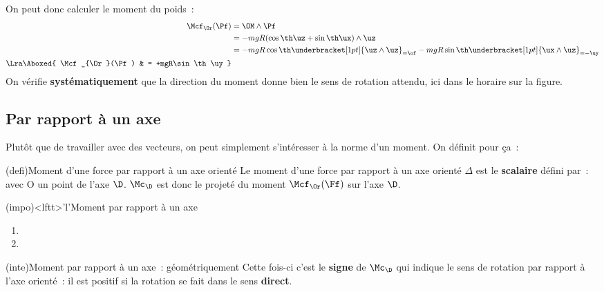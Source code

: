\documentclass[../../main/main.tex]{subfiles}
\begin{document}
\begin{tcb*}
{		On peut donc calculer le moment du poids~:
		\begin{align*}
			\Mcf_{\Or}(\Pf) & = \OM\wedge\Pf                                       \\
			                & = -mgR(\cos\th\uz + \sin\th\ux)\wedge\uz             \\
			                & = -mgR\cos\th\underbracket[1pt]{\uz\wedge\uz}_{=\of}
			-mgR\sin\th\underbracket[1pt]{\ux\wedge\uz}_{=-\uy}                    \\
			\Lra
			\Aboxed{
			\Mcf_{\Or}(\Pf) & = +mgR\sin\th\uy
			}
		\end{align*}
		On vérifie \textbf{systématiquement} que la direction du moment donne bien
		le sens de rotation attendu, ici dans le horaire sur la figure.
	}
\end{tcb*}

\subsection{Par rapport à un axe }
Plutôt que de travailler avec des vecteurs, on peut simplement s'intéresser à la
norme d'un moment. On définit pour ça~:
\begin{tcb*}(defi){Moment d'une force par rapport à un axe orienté}
	Le moment d'une force par rapport à un axe orienté $\Delta$ est le
	\textbf{scalaire} défini par~:
	\psw{
		\[
			\Mc_{\D}(\Ff) =
			\left(\OM\wedge\Ff\right)\cdot\ud =
			\Mcf_{\Or}(\Ff)\cdot\ud
		\]
	}
	avec O un point de l'axe $\D$. $\Mc_{\D}$ est donc le projeté du moment
	$\Mcf_{\Or}(\Ff)$ sur l'axe $\D$.
\end{tcb*}
\begin{tcb*}(impo)<lftt>'l'{Moment par rapport à un axe}
	\begin{enumerate}
		\item {}
		\item {}
	\end{enumerate}
\end{tcb*}
\begin{tcb*}(inte){Moment par rapport à un axe~: géométriquement}
	Cette fois-ci c'est le \textbf{signe} de $\Mc_{\D}$ qui indique le
	sens de rotation par rapport à l'axe orienté~: il est positif si la
	rotation se fait dans le sens \textbf{direct}.
\end{tcb*}
\end{document}

